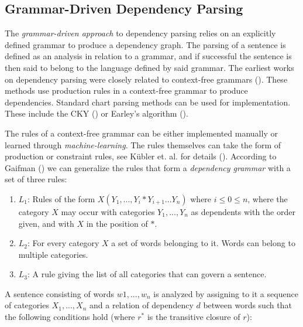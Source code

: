 \documentclass[10pt]{article}
\begin{document}
\subsection{Grammar-Driven Dependency Parsing}

The \textit{grammar-driven approach} to dependency parsing relies on an explicitly defined grammar to produce a dependency graph. The parsing of a sentence is defined as an analysis in relation to a grammar, and if successful the sentence is then said to belong to the language defined by said grammar. The earliest works on dependency parsing were closely related to context-free grammars (\cite{kubler-sandra-mcdonald-ryan-nivre-book}). These methods use production rules in a context-free grammar to produce dependencies. Standard chart parsing methods can be used for implementation. These include the CKY (\cite{younger1967recognition}) or Earley’s algorithm (\cite{earley1970efficient}).

The rules of a context-free grammar can be either implemented manually or learned through \textit{machine-learning}. The rules themselves can take the form of production or constraint rules, see Kübler et. al. for details (\cite{kubler-sandra-mcdonald-ryan-nivre-book}). According to Gaifman (\cite{GAIFMAN1965304}) we can generalize the rules that form a \textit{dependency grammar} with a set of three rules:

\begin{enumerate}
\item \textit{$L_1$}: Rules of the form $X(Y_1, ..., Y_i * Y_{i + 1} ... Y_n)$ where $i \leq 0 \leq n$, where the category $X$ may occur with categories $Y_1, ... ,Y_n$ as dependents with the order given, and with $X$ in the position of $*$.
\item \textit{$L_2$}: For every category $X$ a set of words belonging to it. Words can belong to multiple categories.
\item \textit{$L_3$}: A rule giving the list of all categories that can govern a sentence.
\end{enumerate}

A sentence consisting of words $w1, . . ., w_n$ is analyzed by assigning to it a sequence of categories $X_1, . . ., X_n$ and a relation of dependency $d$ between words such that the following conditions hold (where $r^{*}$ is the transitive closure of $r$):
\end{document}
